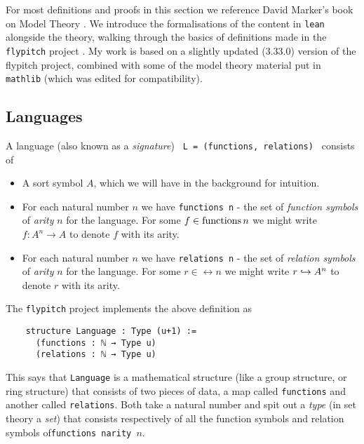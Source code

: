 For most definitions and proofs in this section we reference
David Marker's book on Model Theory \cite{marker}.
We introduce the formalisations of the content in \texttt{lean} alongside the theory,
walking through the basics of definitions made in the \texttt{flypitch} project \cite{flypitch}.
My work is based on a slightly updated (3.33.0) version of the flypitch project,
combined with some of the model theory material put in \texttt{mathlib} (which was edited for compatibility).

\subsection{Languages}
\begin{dfn}[Language]
  A language (also known as a \textit{signature}) \texttt{ L = (functions, relations) } consists of

  \begin{itemize}
    \item A sort symbol $A$, which we will have in the background for intuition.
    \item For each natural number $n$ we have \texttt{functions n} -
          the set of \textit{function symbols} of \textit{arity} $n$ for the language.
          For some $f \in \operatorname{functions} n$ we might write
          $f : A^{n} \to A$ to denote $f$ with its arity.
    \item For each natural number $n$ we have \texttt{relations n} -
          the set of \textit{relation symbols} of \textit{arity} $n$ for the language.
          For some $r \in \rel n$ we might write
          $r \hookrightarrow A^{n}$ to denote $r$ with its arity.
  \end{itemize}

  The \texttt{flypitch} project implements the above definition as

  \begin{lstlisting}
    structure Language : Type (u+1) :=
      (functions : ℕ → Type u)
      (relations : ℕ → Type u)\end{lstlisting}

  This says that \texttt{Language} is a mathematical structure
  (like a group structure, or ring structure)
  that consists of two pieces of data,
  a map called \texttt{functions} and another called \texttt{relations}.
  Both take a natural number and spit out a \textit{type}
  (in set theory a \textit{set})
  that consists respectively of all the function symbols and relation symbols
  of\texttt{functions narity $n$}.


\end{dfn}
